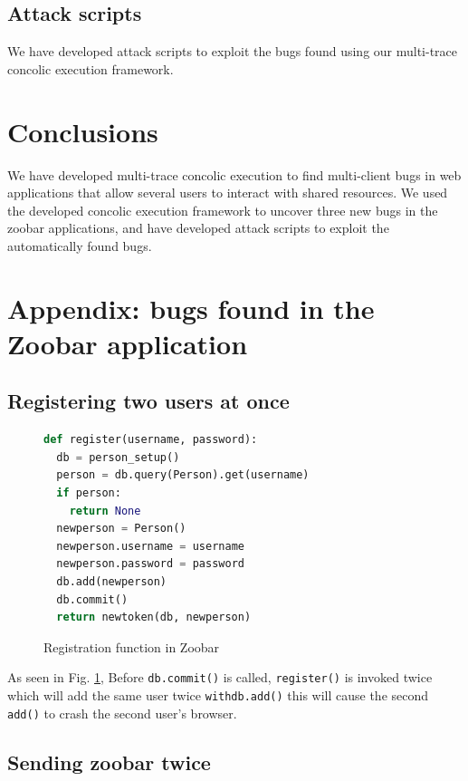 \documentclass{llncs}
\begin{document}

\subsection{Attack scripts}

We have developed attack scripts to exploit the bugs found using our
multi-trace concolic execution framework.

\section{Conclusions}

We have developed multi-trace concolic execution to find multi-client
bugs in web applications that allow several users to interact with
shared resources. We used the developed concolic execution framework
to uncover three new bugs in the zoobar applications, and have
developed attack scripts to exploit the automatically found bugs.

\newpage
\appendix

\section{Appendix: bugs found in the Zoobar application}

\subsection{Registering two users at once}

\begin{figure}
  \begin{lstlisting}[language=Python]
def register(username, password):
  db = person_setup()
  person = db.query(Person).get(username)
  if person:
    return None
  newperson = Person()
  newperson.username = username
  newperson.password = password
  db.add(newperson)
  db.commit()
  return newtoken(db, newperson)
  \end{lstlisting}
  \caption{Registration function in Zoobar}
  \label{fig:registration}
\end{figure}

As seen in Fig. \ref{fig:registration}, Before \texttt{db.commit()} is
called, \texttt{register()} is invoked twice which will add the same
user twice \texttt{withdb.add()} this will cause the second
\texttt{add()} to crash the second user's browser.

\subsection{Sending zoobar twice}
\end{document}
